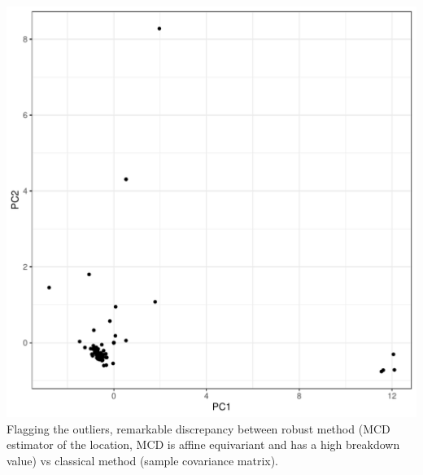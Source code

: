 \documentclass[a4paper,oneside,12pt,titlepage]{article}\usepackage[]{graphicx}\usepackage[]{color}
\makeatletter
\def\maxwidth{ %
  \ifdim\Gin@nat@width>\linewidth
    \linewidth
  \else
    \Gin@nat@width
  \fi
}
\newenvironment{knitrout}{}{} %
\makeatother
\begin{document}
\begin{knitrout}
\includegraphics[width=\maxwidth]{figure/unnamed-chunk-7-2} 
\end{knitrout}
Flagging the outliers, remarkable discrepancy between robust method (MCD estimator of the location, MCD is affine equivariant and has a high breakdown value) vs classical method (sample covariance matrix). 
\end{document}
